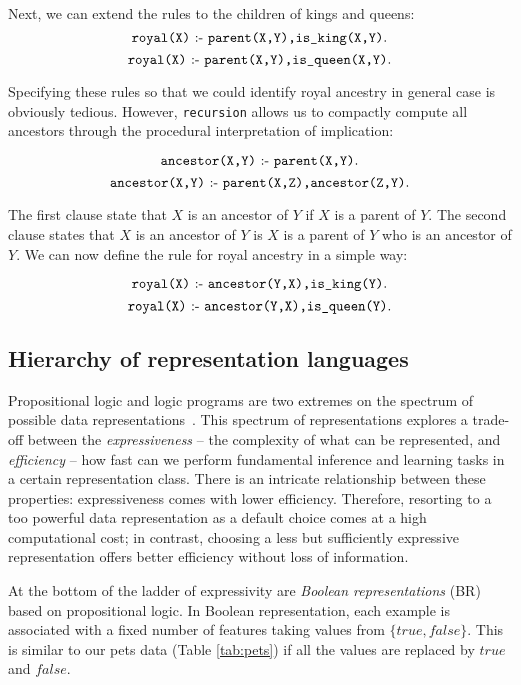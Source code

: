 Next, we can extend the rules to the children of kings and queens:
$$ \text{\texttt{royal(X)}} \text{ :- } \text{\texttt{parent(X,Y),is\_king(X,Y)}}.$$
$$ \text{\texttt{royal(X)}} \text{ :- } \text{\texttt{parent(X,Y),is\_queen(X,Y)}}.$$

Specifying these rules so that we could identify royal ancestry in general case is obviously tedious.
However, \texttt{recursion} allows us to compactly compute all ancestors through the procedural interpretation of implication:

$$ \text{\texttt{ancestor(X,Y)}} \text{ :- } \texttt{parent(X,Y)}.$$
$$ \text{\texttt{ancestor(X,Y)}} \text{ :- } \texttt{parent(X,Z),ancestor(Z,Y)}.$$

The first clause state that $X$ is an ancestor of $Y$ if $X$ is a parent of $Y$.
The second clause states that $X$ is an ancestor of $Y$ is $X$ is a parent of $Y$ who is an ancestor of $Y$.
We can now define the rule for royal ancestry in a simple way:

$$ \text{\texttt{royal(X)}} \text{ :- } \text{\texttt{ancestor(Y,X),is\_king(Y)}}.$$
$$ \text{\texttt{royal(X)}} \text{ :- } \text{\texttt{ancestor(Y,X),is\_queen(Y)}}.$$












\subsection{Hierarchy of representation languages}



Propositional logic and logic programs are two extremes on the spectrum of possible data representations~\cite{LucRLbook}.
This spectrum of representations explores a trade-off between the \textit{expressiveness} -- the complexity of what can be represented, and \textit{efficiency} -- how fast can we perform fundamental inference and learning tasks in a certain representation class.
There is an intricate relationship between these properties: expressiveness comes with lower efficiency.
Therefore, resorting to a too powerful data representation as a default choice comes at a high computational cost; in contrast, choosing a less but sufficiently expressive representation offers better efficiency  without loss of information.


At the bottom of the ladder of expressivity are \textit{Boolean representations} (BR) based on propositional logic.
In Boolean representation, each example is associated with a fixed number of features taking values from $\{true, false\}$.
This is similar to our pets data (Table \ref{tab:pets})  if all the values are replaced by $true$ and $false$.


